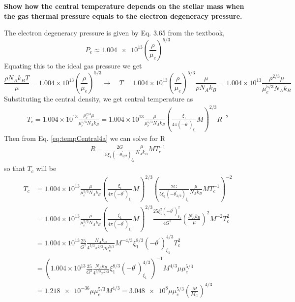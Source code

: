 \subsection{}
\textbf{Show how the central temperature depends on the stellar mass when the gas
thermal pressure equals to the electron degeneracy pressure.}

The electron degeneracy pressure is given by Eq. 3.65 from the textbook,
\begin{equation}
    P_e \approx \num{1.004e13}\left(\frac{\rho}{\mu_e}\right)^{5/3}
\end{equation}
Equating this to the ideal gas pressure we get
\begin{equation}
    \frac{\rho N_A k_B T}{\mu} 
    = 1.004\times 10^{13}\left(\frac{\rho}{\mu_e}\right)^{5/3} \rightarrow\quad 
    T = 1.004\times 10^{13}\left(\frac{\rho}{\mu_e}\right)^{5/3}\frac{\mu}{\rho N_A k_B} 
    = 1.004\times 10^{13}\frac{\rho^{2/3}\mu}{\mu_e^{5/3} N_A k_B}
\end{equation}
Substituting the central density, we get central temperature as 
\begin{align}
    T_c = 1.004\times 10^{13}\frac{\rho_c^{2/3}\mu}{\mu_e^{5/3} N_A k_B}
    = 1.004\times 10^{13}\frac{\mu}{\mu_e^{5/3} N_A k_B} \left(\frac{\xi_1}{4\pi(-\theta^\prime)_{\xi_1}}M\right)^{2/3} R^{-2}
\end{align}
Then from Eq. \ref{eq:tempCentral4a} we can solve for R
\begin{align*}
    R = \frac{2G}{5\xi_1(-\theta^\prime_{3/2})_{\xi_1}}\frac{\mu}{N_Ak_B}M T_c^{-1}
\end{align*}
so that $T_c$ will be
\begin{align*}
    T_c &= 1.004\times 10^{13}\frac{\mu}{\mu_e^{5/3} N_A k_B} \left(\frac{\xi_1}{4\pi(-\theta^\prime)_{\xi_1}}M\right)^{2/3}\left(\frac{2G}{5\xi_1(-\theta^\prime_{3/2})_{\xi_1}}\frac{\mu}{N_Ak_B}M T_c^{-1}\right)^{-2}\\
    &= 1.004\times 10^{13}\frac{\mu}{\mu_e^{5/3} N_A k_B} \left(\frac{\xi_1}{4\pi(-\theta^\prime)_{\xi_1}}M\right)^{2/3}\frac{25\xi_1^2(-\theta^\prime)^2_{\xi_1}}{4G^2}\left(\frac{N_Ak_B}{\mu}\right)^2M^{-2}T_c^{2}\\
    &= 1.004\times 10^{13} \frac{25}{G^2}\frac{N_Ak_B}{4^{5/3}\pi^{2/3} \mu\mu_e^{5/3}}M^{-4/3}\xi^{8/3}_1(-\theta^\prime)^{4/3}_{\xi_1}T_c^2 \\
    &= \left(1.004\times 10^{13} \frac{25}{G^2}\frac{N_Ak_B}{4^{5/3}\pi^{2/3}} \xi^{8/3}_1(-\theta^\prime)^{4/3}_{\xi_1}\right)^{-1}M^{4/3}\mu\mu_e^{5/3}\\
    &= \num{1.218e-36} \mu\mu_e^{5/3} M^{4/3} 
    = \num{3.048e8}\mu\mu_e^{5/3} \left(\frac{M}{M_\odot}\right)^{4/3}
\end{align*}

